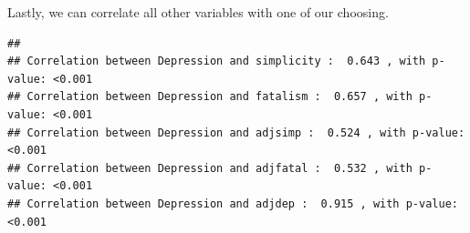 \documentclass[
]{book}
\newenvironment{Shaded}{\begin{snugshade}}{\end{snugshade}}
\newcommand{\CommentTok}[1]{\textcolor[rgb]{0.56,0.35,0.01}{\textit{#1}}}
\newcommand{\ControlFlowTok}[1]{\textcolor[rgb]{0.13,0.29,0.53}{\textbf{#1}}}
\newcommand{\DecValTok}[1]{\textcolor[rgb]{0.00,0.00,0.81}{#1}}
\newcommand{\FunctionTok}[1]{\textcolor[rgb]{0.00,0.00,0.00}{#1}}
\newcommand{\NormalTok}[1]{#1}
\newcommand{\OtherTok}[1]{\textcolor[rgb]{0.56,0.35,0.01}{#1}}
\newcommand{\SpecialCharTok}[1]{\textcolor[rgb]{0.00,0.00,0.00}{#1}}
\newcommand{\StringTok}[1]{\textcolor[rgb]{0.31,0.60,0.02}{#1}}
\begin{document}
Lastly, we can correlate all other variables with one of our choosing.

\begin{Shaded}
\end{Shaded}

\begin{verbatim}
## 
## Correlation between Depression and simplicity :  0.643 , with p-value: <0.001
## Correlation between Depression and fatalism :  0.657 , with p-value: <0.001
## Correlation between Depression and adjsimp :  0.524 , with p-value: <0.001
## Correlation between Depression and adjfatal :  0.532 , with p-value: <0.001
## Correlation between Depression and adjdep :  0.915 , with p-value: <0.001
\end{verbatim}
\end{document}
